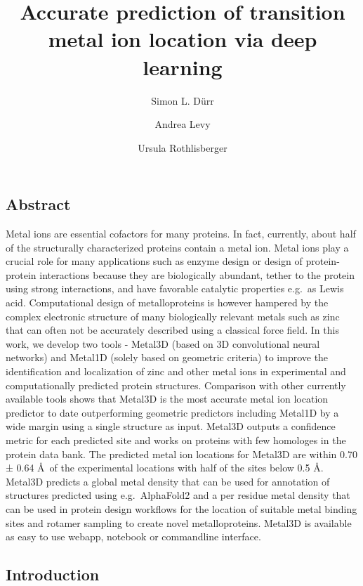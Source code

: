 \documentclass[ lineno,
  9pt]{elife}
\title{Accurate prediction of transition metal ion location via deep learning}
\author[1]{Simon L. Dürr}
\author[1]{Andrea Levy}
\author[1]{Ursula Rothlisberger}
\affil[1]{Laboratory of Computational Chemistry and Biochemistry, Institute of Chemical Sciences and Engineering, Swiss Federal Institute of Technology (EPFL) CH-1015 Lausanne, Switzerland}
\begin{document}
\begin{frontmatter}
\maketitle
\end{frontmatter}




\hypertarget{abstract}{%
\subsection{Abstract}\label{abstract}}

Metal ions are essential cofactors for many proteins. In fact, currently, about half of the structurally characterized proteins contain a metal ion. Metal ions play a crucial role for many applications such as enzyme design or design of protein-protein interactions because they are biologically abundant, tether to the protein using strong interactions, and have favorable catalytic properties e.g.~as Lewis acid. Computational design of metalloproteins is however hampered by the complex electronic structure of many biologically relevant metals such as zinc that can often not be accurately described using a classical force field. In this work, we develop two tools - Metal3D (based on 3D convolutional neural networks) and Metal1D (solely based on geometric criteria) to improve the identification and localization of zinc and other metal ions in experimental and computationally predicted protein structures. Comparison with other currently available tools shows that Metal3D is the most accurate metal ion location predictor to date outperforming geometric predictors including Metal1D by a wide margin using a single structure as input. Metal3D outputs a confidence metric for each predicted site and works on proteins with few homologes in the protein data bank. The predicted metal ion locations for Metal3D are within 0.70 ± 0.64 \AA\, of the experimental locations with half of the sites below 0.5 \AA . Metal3D predicts a global metal density that can be used for annotation of structures predicted using e.g.~AlphaFold2 and a per residue metal density that can be used in protein design workflows for the location of suitable metal binding sites and rotamer sampling to create novel metalloproteins. Metal3D is available as easy to use webapp, notebook or commandline interface.

\hypertarget{introduction}{%
\subsection{Introduction}\label{introduction}}
\end{document}
